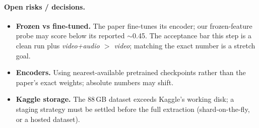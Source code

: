 \documentclass[11pt,a4paper]{article}
\begin{document}
\paragraph{Open risks / decisions.}
\begin{itemize}
  \item \textbf{Frozen vs fine-tuned.} The paper fine-tunes its encoder; our frozen-feature
        probe may score below its reported $\sim$0.45. The acceptance bar this step is a clean
        run plus \emph{video+audio $>$ video}; matching the exact number is a stretch goal.
  \item \textbf{Encoders.} Using nearest-available pretrained checkpoints rather than the
        paper's exact weights; absolute numbers may shift.
  \item \textbf{Kaggle storage.} The 88\,GB dataset exceeds Kaggle's working disk; a staging
        strategy must be settled before the full extraction (shard-on-the-fly, or a hosted
        dataset).
\end{itemize}
\end{document}
